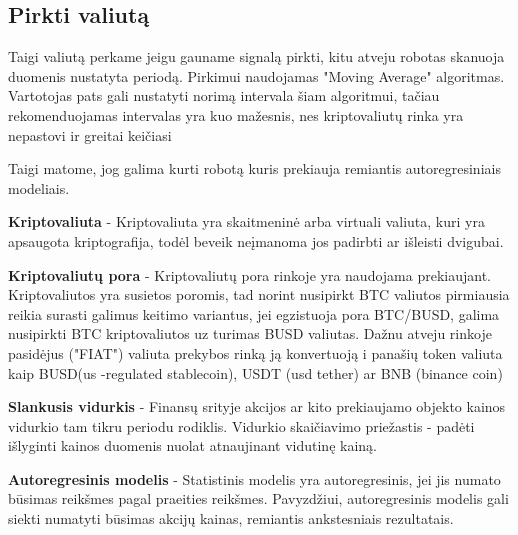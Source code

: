 \documentclass{VUMIFInfKursinis}
\begin{document}
\subsection{Pirkti valiutą}
Taigi valiutą perkame jeigu gauname signalą pirkti, kitu atveju robotas skanuoja duomenis nustatyta periodą. Pirkimui naudojamas "Moving Average" algoritmas. 
Vartotojas pats gali nustatyti norimą intervala šiam algoritmui, tačiau rekomenduojamas intervalas yra kuo mažesnis, nes kriptovaliutų rinka 
yra nepastovi ir greitai keičiasi 




Taigi matome, jog galima kurti robotą kuris prekiauja remiantis autoregresiniais modeliais.

\textbf{Kriptovaliuta} - Kriptovaliuta yra skaitmeninė arba virtuali valiuta, kuri yra apsaugota kriptografija, todėl beveik neįmanoma jos padirbti ar išleisti dvigubai.

\textbf{Kriptovaliutų pora} - Kriptovaliutų pora rinkoje yra naudojama prekiaujant. Kriptovaliutos yra susietos poromis, tad norint nusipirkt BTC valiutos pirmiausia reikia surasti 
galimus keitimo variantus, jei egzistuoja pora BTC/BUSD, galima nusipirkti BTC kriptovaliutos uz turimas BUSD valiutas. Dažnu atveju rinkoje pasidėjus ("FIAT") valiuta
prekybos rinką ją konvertuoją i panašių token valiuta kaip BUSD(us -regulated stablecoin), USDT (usd tether) ar BNB (binance coin)

\textbf{Slankusis vidurkis} - Finansų srityje akcijos ar kito prekiaujamo objekto kainos vidurkio tam tikru periodu rodiklis. Vidurkio skaičiavimo priežastis - padėti išlyginti
kainos duomenis nuolat atnaujinant vidutinę kainą.

\textbf{Autoregresinis modelis} - Statistinis modelis yra autoregresinis, jei jis numato būsimas reikšmes pagal praeities reikšmes. Pavyzdžiui, autoregresinis modelis gali
siekti numatyti būsimas akcijų kainas, remiantis ankstesniais rezultatais.

\printbibliography[heading=bibintoc] %
\end{document}
